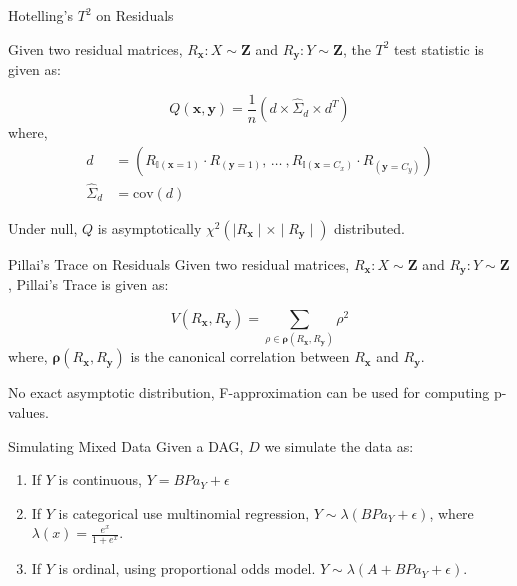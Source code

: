 \documentclass{beamer}
\begin{document}
\begin{frame}{Hotelling's $ T^2 $ on Residuals}

Given two residual matrices, $ R_{\bm{x}}: X \sim \bm{Z} $ and $ R_{\bm{y}}: Y \sim \bm{Z} $, the $ T^2 $ test statistic is given as:

\begin{equation}
	Q(\mathbf{x}, \mathbf{y}) = \frac{1}{n} \left( d \times \hat{\Sigma}_d \times d^T \right)
\end{equation}
where,
\begin{equation}
	\begin{split}
		d &= (R_{\mathbb{I}(\mathbf{x}=1)} \cdot R_{(\mathbf{y}=1)}, \, \ldots \ , R_{\mathbb{I}(\mathbf{x}=C_x)} \cdot R_{(\mathbf{y}=C_y)} ) \\
		\hat{\Sigma}_d &= \textrm{cov}(d)
	\end{split}
\end{equation}


Under null, $ Q $ is asymptotically $ \chi^2 (\mid R_\mathbf{x} \mid \times \mid R_\mathbf{y} \mid) $ distributed.

\end{frame}

\begin{frame}{Pillai's Trace on Residuals}
Given two residual matrices, $ R_{\bm{x}}: X \sim \bm{Z} $ and $ R_{\bm{y}}: Y \sim \bm{Z} $, Pillai's Trace is given as:

\begin{equation}
	\textit{V}(R_\mathbf{x}, R_\mathbf{y}) = \sum_{\rho \in \bm{\rho}(R_\mathbf{x}, R_\mathbf{y})} \rho^2
\end{equation}
where, $ \bm{\rho}({R_\mathbf{x}, R_\mathbf{y}}) $  is the canonical correlation between $ R_\mathbf{x} $ and $ R_\mathbf{y} $.

\vspace{1em}

No exact asymptotic distribution, F-approximation can be used for computing p-values.

\end{frame}

\begin{frame}{Simulating Mixed Data}
	Given a DAG, $ D $ we simulate the data as:
	\begin{enumerate}
		\item If $ Y $ is continuous, $ Y = B Pa_Y + \epsilon $
		\item If $ Y $ is categorical use multinomial regression, $ Y \sim \lambda(B Pa_Y + \epsilon) $, where $ \lambda(x) = \frac{e^x}{1+e^x} $.
		\item If $ Y $ is ordinal, using proportional odds model. $ Y \sim \lambda(A + B Pa_Y + \epsilon) $.
	\end{enumerate}
\end{frame}
\end{document}
